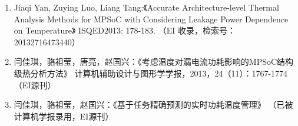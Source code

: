 \begin{paper}
\begin{enumerate}
	

	\item Jiaqi Yan, Zuying Luo, Liang Tang:《Accurate Architecture-level Thermal Analysis Methods for MPSoC with Considering Leakage Power Dependence on Temperature》 ISQED2013: 178-183. （EI 收录，检索号：20132716473440）
	\item 闫佳琪，骆祖莹，唐亮，赵国兴：《考虑温度对漏电流功耗影响的MPSoC结构级热分析方法》 计算机辅助设计与图形学学报，2013，24（11）：1767-1774 （EI源刊）
	\item 闫佳琪，骆祖莹，赵国兴：《基于任务精确预测的实时功耗温度管理》 （已被计算机学报录用，EI源刊）


  \end{enumerate}

\end{paper}
